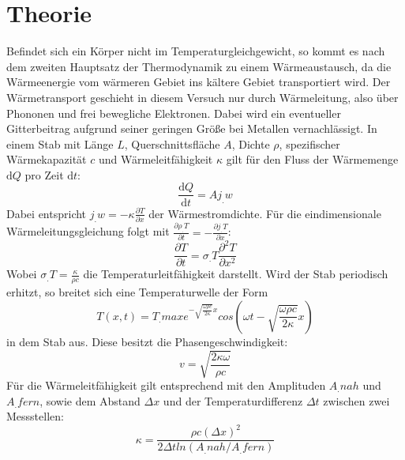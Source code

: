 
\section{Theorie}
\label{sec:Theorie}

Befindet sich ein Körper nicht im Temperaturgleichgewicht, so kommt es nach dem zweiten Hauptsatz der Thermodynamik zu einem Wärmeaustausch, da die Wärmeenergie vom wärmeren Gebiet ins kältere Gebiet transportiert wird. Der Wärmetransport geschieht in diesem Versuch nur durch Wärmeleitung, also über Phononen und frei bewegliche Elektronen. Dabei wird ein eventueller Gitterbeitrag aufgrund seiner geringen Größe bei Metallen vernachlässigt.\newline
In einem Stab mit Länge $L$, Querschnittsfläche $A$, Dichte $\rho$, spezifischer Wärmekapazität $c$ und Wärmeleitfähigkeit $\kappa$ gilt für den Fluss der Wärmemenge $\mathrm{d}Q$ pro Zeit $\mathrm{d}t$:
\begin{equation}
\frac{\mathrm{d}Q}{\mathrm{d}t} = A j_.w \label{eq:dQ/dt}
\end{equation}    
Dabei entspricht $j_.w = -\kappa \frac{\partial T}{\partial x}$ der Wärmestromdichte. \newline
Für die eindimensionale Wärmeleitungsgleichung folgt mit $\frac{\partial \rho_.T}{\partial t} = -\frac{\partial j_.T}{\partial x}$:
\begin{equation}
\frac{\partial T}{\partial t} = \sigma_.T \frac{\partial^2 T}{\partial x^2} \label{eq:T/t}
\end{equation}
Wobei $\sigma_.T = \frac{\kappa}{\rho c}$ die Temperaturleitfähigkeit darstellt.\newline
Wird der Stab periodisch erhitzt, so breitet sich eine Temperaturwelle der Form
\begin{equation}
T(x, t) = T_.{max} e^{-\sqrt{\frac{\omega\rho c}{2\kappa}} x}cos\left(\omega t-\sqrt{\frac{\omega\rho c}{2\kappa}}x\right) \label{eq:T}
\end{equation}
in dem Stab aus. Diese besitzt die Phasengeschwindigkeit:
\begin{equation}
v = \sqrt{\frac{2\kappa\omega}{\rho c}} \label{eq:v}
\end{equation}
Für die Wärmeleitfähigkeit gilt entsprechend mit den Amplituden $A_.{nah}$ und $A_.{fern}$, sowie dem Abstand $\Delta x$ und der Temperaturdifferenz $\Delta t$  zwischen zwei Messstellen: 
\begin{equation}
\kappa = \frac{\rho c(\Delta x)^2}{2\Delta t ln(A_.{nah}/A_.{fern})} \label{eq:k}
\end{equation}